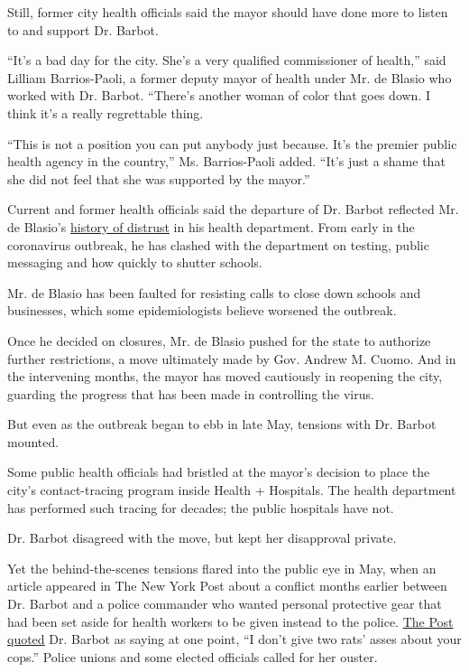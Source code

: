 Still, former city health officials said the mayor should have done more
to listen to and support Dr. Barbot.

``It's a bad day for the city. She's a very qualified commissioner of
health,'' said Lilliam Barrios-Paoli, a former deputy mayor of health
under Mr. de Blasio who worked with Dr. Barbot. ``There's another woman
of color that goes down. I think it's a really regrettable thing.

``This is not a position you can put anybody just because. It's the
premier public health agency in the country,'' Ms. Barrios-Paoli added.
``It's just a shame that she did not feel that she was supported by the
mayor.''

Current and former health officials said the departure of Dr. Barbot
reflected Mr. de Blasio's
\href{https://www.nytimes.com/2020/03/16/nyregion/coronavirus-bill-de-blasio.html}{history
of distrust} in his health department. From early in the coronavirus
outbreak, he has clashed with the department on testing, public
messaging and how quickly to shutter schools.

Mr. de Blasio has been faulted for resisting calls to close down schools
and businesses, which some epidemiologists believe worsened the
outbreak.

Once he decided on closures, Mr. de Blasio pushed for the state to
authorize further restrictions, a move ultimately made by Gov. Andrew M.
Cuomo. And in the intervening months, the mayor has moved cautiously in
reopening the city, guarding the progress that has been made in
controlling the virus.

But even as the outbreak began to ebb in late May, tensions with Dr.
Barbot mounted.

Some public health officials had bristled at the mayor's decision to
place the city's contact-tracing program inside Health + Hospitals. The
health department has performed such tracing for decades; the public
hospitals have not.

Dr. Barbot disagreed with the move, but kept her disapproval private.

Yet the behind-the-scenes tensions flared into the public eye in May,
when an article appeared in The New York Post about a conflict months
earlier between Dr. Barbot and a police commander who wanted personal
protective gear that had been set aside for health workers to be given
instead to the police.
\href{https://nypost.com/2020/05/13/nyc-health-commissioner-wouldnt-supply-nypd-with-masks/}{The
Post quoted} Dr. Barbot as saying at one point, ``I don't give two rats'
asses about your cops.'' Police unions and some elected officials called
for her ouster.

